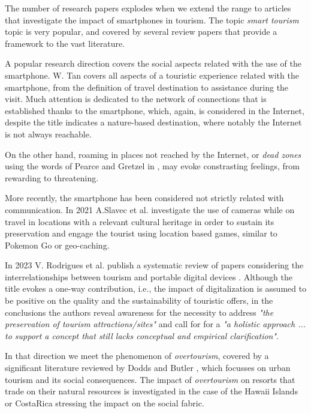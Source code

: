\documentclass[sustainability,article,submit,pdftex,moreauthors]{Definitions/mdpi}
\begin{document}
The number of research papers explodes when we extend the range to articles that investigate the impact of smartphones in tourism. The topic {\em smart tourism} topic is very popular, and covered by several review papers that provide a framework to the vast literature.

A popular research direction covers the social aspects related with the use of the smartphone. W. Tan \cite{tan17a} covers all aspects of a touristic experience related with the smartphone, from the definition of travel destination to assistance during the visit. Much attention is dedicated to the network of connections that is established thanks to the smartphone, which, again, is considered in the Internet, despite the title indicates a nature-based destination, where notably the Internet is not always reachable.

On the other hand, roaming in places not reached by the Internet, or {\em dead zones} using the words of Pearce and Gretzel in \cite{pea12a}, may evoke constrasting feelings, from rewarding to threatening.

More recently, the smartphone has been considered not strictly related with communication. In 2021 A.Slavec et al. investigate the use of cameras \cite{sla21a} while on travel in locations with a relevant cultural heritage in order to sustain its preservation and engage the tourist using location based games, similar to Pokemon Go or geo-caching.

In 2023 V. Rodrigues et al. publish a systematic review of papers considering the interrelationships between tourism and portable digital devices \cite{rod23a}. Although the title evokes a one-way contribution, i.e., the impact of digitalization is assumed to be positive on the quality and the sustainability of touristic offers, in the conclusions the authors reveal awareness for the necessity to address {\em "the preservation of tourism attractions/sites"} and call for for a {\em "a holistic approach ... to support a concept that still lacks conceptual and empirical clarification"}.

In that direction we meet the phenomenon of {\em overtourism}, covered by a significant literature reviewed by Dodds and Butler \cite{dod19a}, which focusses on urban tourism and its social consequences. The impact of {\em overtourism} on resorts that trade on their natural resources is investigated in the case of the Hawaii Islands \cite{lin22a} or CostaRica \cite{mat10a} stressing the impact on the social fabric.
\end{document}
